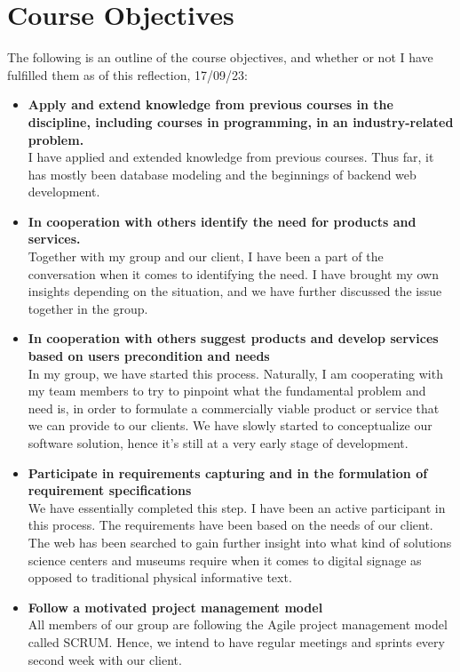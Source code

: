 \documentclass{exam}
\begin{document}
\pagebreak
\section{Course Objectives}
The following is an outline of the course objectives, and whether or not I have fulfilled them as of this reflection, 17/09/23:\\
\begin{itemize}
\item \textbf{Apply and extend knowledge from previous courses in the discipline, including courses in programming, in an industry-related problem.}\\
\bigskip
I have applied and extended knowledge from previous courses. Thus far, it has mostly been database modeling and the beginnings of backend web development.

\item \textbf{In cooperation with others identify the need for products and services.}\\
\bigskip
Together with my group and our client, I have been a part of the conversation when it comes to identifying the need. I have brought my own insights depending on the situation, and we have further discussed the issue together in the group.

\item \textbf{In cooperation with others suggest products and develop services based on users precondition and needs}\\
\bigskip
In my group, we have started this process. Naturally, I am cooperating with my team members to try to pinpoint what the fundamental problem and need is, in order to formulate a commercially viable product or service that we can provide to our clients. We have slowly started to conceptualize our software solution, hence it's still at a very early stage of development.

\item \textbf{Participate in requirements capturing and in the formulation of requirement specifications}\\
\bigskip
We have essentially completed this step. I have been an active participant in this process. The requirements have been based on the needs of our client. The web has been searched to gain further insight into what kind of solutions science centers and museums require when it comes to digital signage as opposed to traditional physical informative text.


\item \textbf{Follow a motivated project management model}\\
\bigskip
All members of our group are following the Agile project management model called SCRUM. Hence, we intend to have regular meetings and sprints every second week with our client.\\
\bigskip


\end{itemize}
\end{document}
